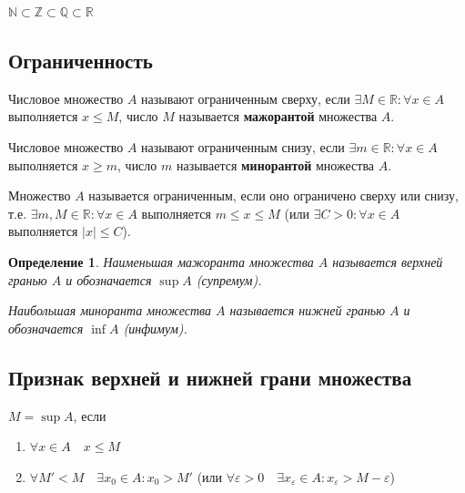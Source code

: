 \documentclass[a4paper,oneside]{article}
\newtheorem{definition}{Определение}[subsection]
\begin{document}
$\mathbb{N} \subset \mathbb{Z} \subset \mathbb{Q} \subset \mathbb{R}$

\subsection{Ограниченность}

Числовое множество $A$ называют ограниченным сверху, если 
$\exists M \in \mathbb{R}: \forall x \in A$ выполняется $x \le M$,
число $M$ называется \textbf{мажорантой} множества $A$.

Числовое множество $A$ называют ограниченным снизу, если 
$\exists m \in \mathbb{R}: \forall x \in A$ выполняется $x \ge m$,
число $m$ называется \textbf{минорантой} множества $A$.

Множество $A$ называется ограниченным, если оно ограничено сверху или снизу,
т.е. $\exists m, M \in \mathbb{R}: \forall x \in A$ выполняется $m \le x \le M$
(или $\exists C > 0: \forall x \in A$ выполняется $|x| \le C$).

\begin{definition}
    Наименьшая мажоранта множества $A$ называется верхней гранью $A$ и обозначается
    $\sup A$ (супремум).

    Наибольшая миноранта множества $A$ называется нижней гранью $A$ и обозначается
    $\inf A$ (инфимум).
\end{definition}



\subsection{Признак верхней и нижней грани множества}

$M = \sup A$, если 
\begin{enumerate}
    \item $\forall x \in A \quad x \le M$
    \item $\forall M' < M \quad \exists x_0 \in A: x_0 > M'$
    (или $\forall \varepsilon > 0 \quad \exists x_\varepsilon \in A: x_\varepsilon > M - \varepsilon$)
\end{enumerate}
\end{document}
